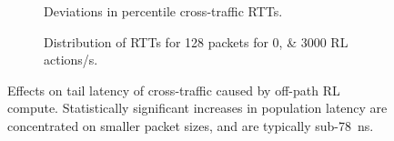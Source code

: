 \documentclass[
sigconf,natbib=false
,anonymous=true
,10pt
]{acmart}
\begin{document}
\begin{figure}
	\centering
	\begin{subfigure}{0.45\linewidth}
		\caption{Deviations in  percentile cross-traffic RTTs.\label{fig:dataplane-heat}}
	\end{subfigure}
	\hspace{0.05\linewidth}
		\begin{subfigure}{0.45\linewidth}
		\caption{Distribution of RTTs for \SI{128}{\byte} packets for \numlist{0;3000} RL actions/s.\label{fig:dataplane-example}}
	\end{subfigure}
	\caption{Effects on tail latency of cross-traffic caused by off-path RL compute. Statistically significant increases in population latency are concentrated on smaller packet sizes, and are typically sub-\SI{78}{\nano\second}.\label{fig:dataplane-coop}}
\end{figure}
\end{document}
